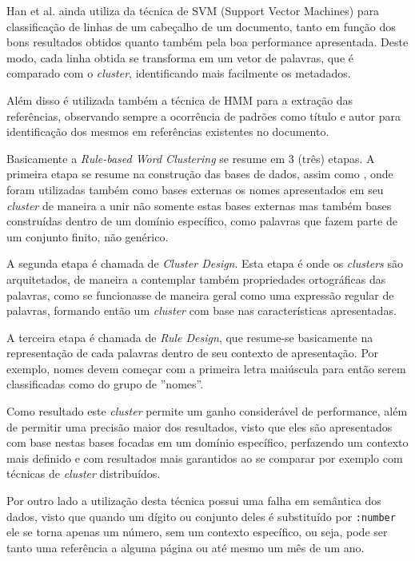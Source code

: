 Han et al. ainda utiliza da técnica  de SVM (Support Vector Machines) para classificação de linhas de um cabeçalho de um documento, tanto em função dos bons resultados obtidos quanto também pela boa performance apresentada. Deste modo, cada linha obtida se transforma em um vetor de palavras, que é comparado com o \textit{cluster}, identificando mais facilmente os metadados.

Além disso é utilizada também a técnica de HMM \cite{hmm2} para a extração das referências, observando sempre a ocorrência de padrões como título e autor para identificação dos mesmos em referências existentes no documento.

Basicamente a \textit{Rule-based Word Clustering} se resume em 3 (três) etapas. A primeira etapa se resume na construção das bases de dados, assim como \cite{svm}, onde foram utilizadas também como bases externas os nomes apresentados em seu \textit{cluster} de maneira a unir não somente estas bases externas mas também bases construídas dentro de um domínio específico, como palavras que fazem parte de um conjunto finito, não genérico.

A segunda etapa é chamada de \textit{Cluster Design}. Esta etapa é onde os \textit{clusters} são arquitetados, de maneira a contemplar também propriedades ortográficas das palavras, como se funcionasse de maneira geral como uma expressão regular de palavras, formando então um \textit{cluster} com base nas características apresentadas.

A terceira etapa é chamada de \textit{Rule Design}, que resume-se basicamente na representação de cada palavras dentro de seu contexto de apresentação. Por exemplo, nomes devem começar com a primeira letra maiúscula para então serem classificadas como do grupo de ''nomes''.

Como resultado este \textit{cluster} permite um ganho considerável de performance, além de permitir uma precisão maior dos resultados, visto que eles são apresentados com base nestas bases focadas em um domínio específico, perfazendo um contexto mais definido e com resultados mais garantidos ao se comparar por exemplo com técnicas de \textit{cluster} distribuídos.

Por outro lado a utilização desta técnica possui uma falha em semântica dos dados, visto que quando um dígito ou conjunto deles é substituído por \texttt{:number} ele se torna apenas um número, sem um contexto específico, ou seja, pode ser tanto uma referência a alguma página ou até mesmo um mês de um ano.

